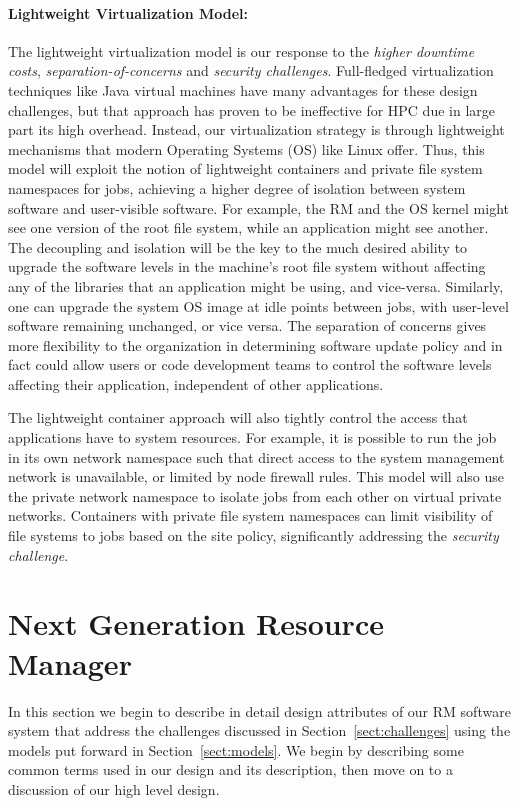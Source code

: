 \documentclass{article}
\begin{document}
\paragraph{Lightweight Virtualization Model:}
The lightweight virtualization model is our response to 
the {\sl higher downtime costs}, {\sl separation-of-concerns} and
{\sl security challenges}. Full-fledged virtualization techniques like Java
virtual machines have many advantages for these design challenges, but
that approach has proven to be ineffective for HPC due in large part
its high overhead. Instead, our virtualization strategy is through lightweight
mechanisms that modern Operating Systems (OS) like Linux offer.  Thus,
this model will exploit the notion of lightweight containers and private
file system namespaces for jobs, achieving a higher degree of isolation
between system software and user-visible software. For example, the RM
and the OS kernel might see one version of the root file system, while
an application might see another. The decoupling and isolation will be
the key to the much desired ability to upgrade the software levels in the
machine's root file system without affecting any of the libraries that
an application might be using, and vice-versa. Similarly, one can upgrade
the system OS image at idle points between jobs, with user-level software
remaining unchanged, or vice versa. The separation of concerns gives more
flexibility to the organization in determining software update policy
and in fact could allow users or code development teams to control the
software levels affecting their application, independent of other
applications.


The lightweight container approach will also tightly control the access
that applications have to system resources. For example, it is possible to
run the job in its own network namespace such that direct access to the
system management network is unavailable, or limited by node firewall
rules. This model will  also use the private network namespace to isolate
jobs from each other on virtual private networks.
Containers with private file system namespaces can limit visibility of
file systems to jobs based on the site policy, significantly addressing
the {\sl security challenge}.


\section{Next Generation Resource Manager}
\label{sect:ngrm}

In this section we begin to describe in detail design attributes
of our RM software system that address the challenges discussed in
Section~\ref{sect:challenges} using the models put forward in
Section~\ref{sect:models}. We begin by describing some common terms
used in our design and its description, then move on to a discussion
of our high level design.
\end{document}
